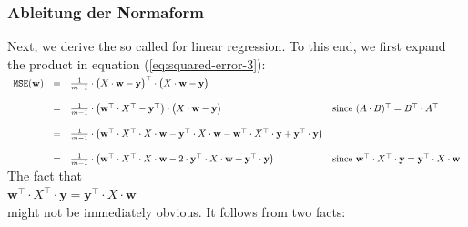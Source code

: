 \documentclass[12pt]{article}
\begin{document}
\subsubsection{Ableitung der Normaform}
{\color{red}{***********************************************************************\\ 
 ***********************  Übersetzung in Deutsch ************************\\
************************************************************************}}
%
Next, we derive the so called {\color{blue}{normal equation}} 
for linear regression.  To this end, we first
expand the product in equation (\ref{eq:squared-error-3}):
\\[0.2cm]
\hspace*{0.3cm}
$
\begin{array}[t]{lcll}
 \mathtt{MSE}(\mathbf{w}) & = & 
  \frac{1}{m-1} \cdot \bigl(X \cdot \mathbf{w} - \textbf{y}\bigr)^\top \cdot \bigl(X \cdot \mathbf{w} - \textbf{y}\bigr) 
 \\[0.5cm]
 & = & 
 \frac{1}{m-1} \cdot \bigl(\mathbf{w}^\top \cdot X^\top - \textbf{y}^\top\bigr) \cdot \bigl(X \cdot \mathbf{w} - \textbf{y}\bigr) 
 & \mbox{since $(A \cdot B)^\top = B^\top \cdot A^\top$}
 \\[0.5cm]
 & = & 
  \frac{1}{m-1} \cdot \bigl(\mathbf{w}^\top \cdot X^\top \cdot X \cdot \mathbf{w} 
                             - \textbf{y}^\top \cdot X \cdot \mathbf{w} 
                             - \mathbf{w}^\top \cdot X^\top \cdot \mathbf{y}
                             + \mathbf{y}^\top \cdot \mathbf{y}
                       \bigr)
 \\[0.5cm]
 & = & 
 \frac{1}{m-1} \cdot \bigl(\mathbf{w}^\top \cdot X^\top \cdot X \cdot \mathbf{w} 
                             - 2 \cdot \textbf{y}^\top \cdot X \cdot \mathbf{w} 
                             + \mathbf{y}^\top \cdot \mathbf{y}
                       \bigr)
 & \mbox{since $\mathbf{w}^\top \cdot X^\top \cdot \mathbf{y} = \textbf{y}^\top \cdot X \cdot \mathbf{w}$}
\end{array}
$
\\[0.2cm]
The fact that 
\\[0.2cm]
\hspace*{1.3cm}
$\mathbf{w}^\top \cdot X^\top \cdot \mathbf{y} = \textbf{y}^\top \cdot X \cdot \mathbf{w}$
\\[0.2cm]
might not be immediately obvious.  It follows from two facts:
\end{document}
